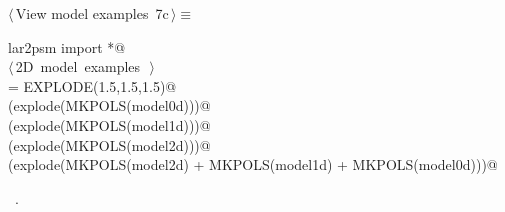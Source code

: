 \documentclass[11pt,oneside]{article}	%
\begin{document}
\begin{flushleft} \small
\begin{minipage}{\linewidth} \label{scrap20}
\protect{}$\langle\,$View model examples\nobreak\ {\footnotesize 7c}$\,\rangle\equiv$
\vspace{-1ex}
\begin{list}{}{} \item
\mbox{}\verb@from lar2psm import *@\\
\mbox{}\verb@@\hbox{$\langle\,$2D model examples\nobreak\ {\footnotesize {}}$\,\rangle$}\verb@@\\
\mbox{}\verb@explode = EXPLODE(1.5,1.5,1.5)@\\
\mbox{}\verb@VIEW(explode(MKPOLS(model0d)))@\\
\mbox{}\verb@VIEW(explode(MKPOLS(model1d)))@\\
\mbox{}\verb@VIEW(explode(MKPOLS(model2d)))@\\
\mbox{}\verb@VIEW(explode(MKPOLS(model2d) + MKPOLS(model1d) + MKPOLS(model0d)))@\\
\mbox{}\verb@@{\NWsep}
\end{list}
\vspace{-1ex}
\footnotesize\addtolength{\baselineskip}{-1ex}
\begin{list}{}{\setlength{\itemsep}{-\parsep}\setlength{\itemindent}{-\leftmargin}}
\item \NWtxtMacroRefIn\ .
\end{list}
\end{minipage}\\[4ex]
\end{flushleft}
\end{document}
